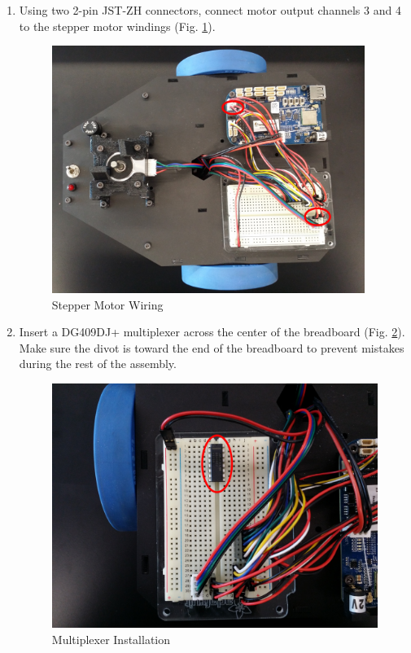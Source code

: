 \begin{enumerate}[label = \textbf{Step \arabic*.}]
    \item Using two 2-pin JST-ZH connectors, connect motor output channels 3 and 4 to the stepper motor windings (Fig. \ref{fig:stepperWiring}).
    \begin{figure}[H]
        \centering
        \includegraphics[width=4in]{figs/img/assembly/07-stepperWiring.png}
        \caption{Stepper Motor Wiring}
        \label{fig:stepperWiring}
    \end{figure}
    \pagebreak

    \item Insert a DG409DJ+ multiplexer across the center of the breadboard (Fig. \ref{fig:multiplexer}). Make sure the divot is toward the end of the breadboard to prevent mistakes during the rest of the assembly.
    \begin{figure}[H]
        \centering
        \includegraphics[width=4.2in]{figs/img/assembly/08-multiplexer.png}
        \caption{Multiplexer Installation}
        \label{fig:multiplexer}
    \end{figure}


\end{enumerate}
